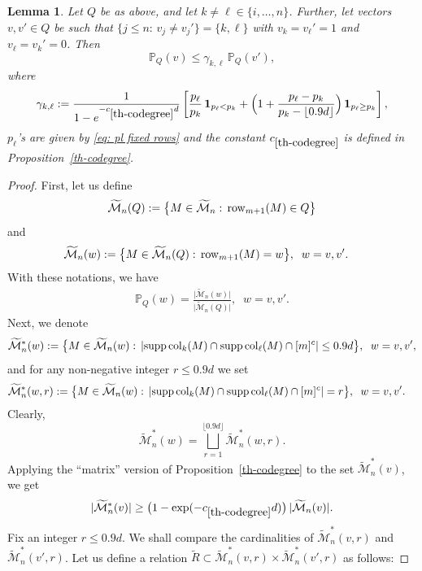 \documentclass[12pt]{article}
\newtheorem{lemma}[theorem]{Lemma}
\theoremstyle{definition}
\theoremstyle{plain}
\newcommand{\supp}{{\rm supp\,}}
\def\Prob{{\mathbb P}}
\def\MatrixSet{{\mathcal M}_n}
\def\Col{{\rm col}}
\def\Row{{\rm row}}
\begin{document}
\begin{lemma}\label{lem-prob-v-v'}
Let $Q$ be as above, and let $k\neq \ell\in\{i,\ldots,n\}$.
Further, let vectors $v,v'\in Q$ be such that $\{j\leq n:\,v_j\neq v_j'\}=\{k,\ell\}$ with $v_k=v_\ell'=1$ and $v_\ell=v_k'=0$.
Then
$$\Prob_Q(v)\leq \gamma_{k,\ell}\, \Prob_Q(v'),$$
where 
\begin{equation}\label{eq: gamma def}
\gamma_{k,\ell}:=\frac{1}{1-e^{-c_{\ref{th-codegree}}d}}\left[\frac{p_\ell}{p_k}\, \mathbf{1}_{p_\ell<p_k}+ 
\Big( 1+\frac{p_\ell -p_k}{p_k-\lfloor 0.9d\rfloor}\Big)\, \mathbf{1}_{p_\ell\geq p_k}\right],
\end{equation}
$p_\ell$'s are given by \eqref{eq: pl fixed rows}
and the constant $c_{\ref{th-codegree}}$ is defined in Proposition~\ref{th-codegree}.
\end{lemma}
\begin{proof}
First, let us define 
$$
\widetilde\MatrixSet(Q):=\big\{ M\in \widetilde\MatrixSet:\, \Row_{m+1}(M)\in Q\big\}
$$
and
\begin{align*}
\widetilde\MatrixSet(w)&:=\big\{ M\in \widetilde\MatrixSet(Q):\, \Row_{m+1}(M)=w\big\},\;\;w=v,v'.
\end{align*}
With these notations, we have 
\begin{align*}
\Prob_Q(w)= \frac{\vert\widetilde\MatrixSet(w)\vert }{\vert\widetilde\MatrixSet(Q)\vert},\;\;w=v,v'.
\end{align*}
Next, we denote
$$
\widetilde\MatrixSet^{*}(w):=
\bigl\{M\in \widetilde\MatrixSet(w):\, \vert \supp\Col_k(M)\cap\supp\Col_\ell(M)\cap [m]^c\vert\leq 0.9d\bigr\},\;\;w=v,v',
$$
and for any non-negative integer $r\leq 0.9d$ we set
\begin{align*}
\widetilde\MatrixSet^{*}(w,r)&:=
\bigl\{M\in \widetilde\MatrixSet(w):\, \vert \supp\Col_k(M)\cap\supp\Col_\ell(M)\cap [m]^c\vert=r\bigr\},\;\;w=v,v'.
\end{align*}
Clearly,
\begin{equation}\label{eq1-lem-prob-v-v'}
\widetilde\MatrixSet^{*}(w)=\bigsqcup_{r=1}^{\lfloor 0.9d\rfloor} \widetilde\MatrixSet^{*}(w,r).
\end{equation}
Applying the ``matrix'' version of Proposition~\ref{th-codegree} to the set $\widetilde\MatrixSet^{*}(v)$, we get
\begin{equation}\label{eq2-lem-prob-v-v'}
\vert \widetilde\MatrixSet^{*}(v)\vert \geq \big(1-\exp(-c_{\ref{th-codegree}}d)\big)\, \vert \widetilde\MatrixSet(v)\vert.
\end{equation}
Fix an integer $r\leq 0.9d$. We shall compare the cardinalities of 
$\widetilde\MatrixSet^{*}(v,r)$ and $\widetilde\MatrixSet^{*}(v',r)$.
Let us define a relation $\widetilde R\subset \widetilde\MatrixSet^{*}(v,r)
\times \widetilde\MatrixSet^{*}(v',r)$ as follows:


\end{proof}
\end{document}
